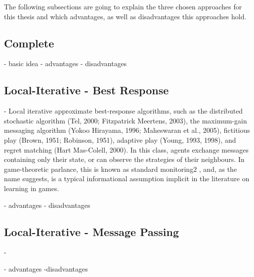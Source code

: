     The following subsections are going to explain the three chosen approaches for this thesis and which advantages, as well as disadvantages this approaches hold.
    
    \cite{Likhachev}
    
\subsection{Complete}

    - basic idea
    - advantages
    - disadvantages

\subsection{Local-Iterative - Best Response}

\cite{Chapman2011}
\cite{Maheswaran} %

    - Local iterative approximate best-response algorithms, such as the distributed stochastic algorithm
(Tel, 2000; Fitzpatrick  Meertens, 2003), the maximum-gain messaging algorithm (Yokoo 
Hirayama, 1996; Maheswaran et al., 2005), fictitious play (Brown, 1951; Robinson, 1951),
adaptive play (Young, 1993, 1998), and regret matching (Hart  Mas-Colell, 2000). In this class,
agents exchange messages containing only their state, or can observe the strategies of their
neighbours. In game-theoretic parlance, this is known as standard monitoring2
, and, as the name
suggests, is a typical informational assumption implicit in the literature on learning in games.


    - advantages
    - disadvantages

\subsection{Local-Iterative - Message Passing}
    
    \cite{Chapman2011}
    - 
    
    - advantages
    -disadvantages